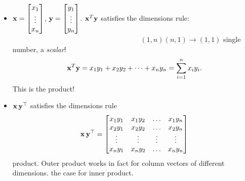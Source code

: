 \documentclass[8pt,dvipsnames]{beamer}
\newcommand{\myemph}[1]{{\color{blue}{#1}}}
\begin{document}
\begin{frame}
  \begin{itemize}
  \item  ${\bf x} =
    \begin{bmatrix}
      x_1\\\vdots\\x_n
    \end{bmatrix}$, ${\bf y} =
    \begin{bmatrix}
      y_1\\\vdots\\y_n
    \end{bmatrix}$. ${\bf x}^T {\bf y}$ satisfies the dimensions rule:\\
    ~~~~~~~~~~~~~~~~~~~~~~~~~~~~~~~~~~~~$(1,n)(n,1)\to(1,1)$ single number,  a \emph{scalar}!
    $$
    {\bf x}^T {\bf y} =
    x_1 y_1 + x_2 y_2 + \dots + x_n y_n = \sum_{i=1}^{n} x_i y_i.
    $$
    This is the \myemph{inner} product! 
  \item ${\bf x}\,{\bf y}^\top$ satisfies the dimensions rule
    $$
    {\bf x}\,{\bf y}^\top =
    \begin{bmatrix}
      x_1 y_1 & x_1 y_2 & \hdots & x_1 y_n\\ 
      x_2 y_1 & x_2 y_2 & \hdots & x_2 y_n\\ 
      \vdots & \vdots &  \vdots & \vdots\\
      x_n y_1 & x_n y_2 & \hdots & x_n y_n\\ 
    \end{bmatrix}
    $$
    \myemph{Outer} product. Outer product works in fact for column
    vectors of different dimensions. \myemph{Not} the case for inner
    product.
  \end{itemize}
\end{frame}
\end{document}
